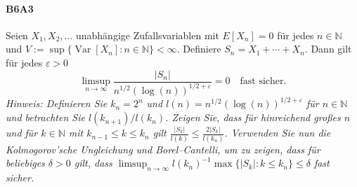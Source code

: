 \documentclass{article}
\begin{document}
\paragraph{B6A3}
Seien $X_1,X_2,\dots$ unabhängige Zufallsvariablen mit $E[X_n]=0$ für jedes $n\in\mathbb{N}$ und $V:=\sup\{\operatorname{Var}[X_n]:n\in\mathbb{N}\}<\infty$.
Definiere $S_n=X_1+\cdots+X_n$.
Dann gilt für jedes $\varepsilon>0$
\[
  \limsup_{n\to\infty}\frac{|S_n|}{n^{1/2}(\log(n))^{1/2+\varepsilon}}=0\quad\text{fast sicher.}
\]
\emph{Hinweis: Definieren Sie $k_n=2^n$ und $l(n)=n^{1/2}(\log(n))^{1/2+\varepsilon}$ für $n\in\mathbb{N}$ und betrachten Sie $l(k_{n+1})/l(k_n)$.
  Zeigen Sie, dass für hinreichend großes $n$ und für $k\in\mathbb{N}$ mit $k_{n-1}\leq k\leq k_n$ gilt $\frac{|S_k|}{l(k)}\leq\frac{2|S_k|}{l({k_n})}$.
  Verwenden Sie nun die Kolmogorov'sche Ungleichung und Borel--Cantelli, um zu zeigen, dass für beliebiges $\delta>0$ gilt, dass $\limsup_{n\to\infty}l(k_n)^{-1}\max\{|S_k|: k\leq k_n\}\leq\delta$ fast sicher.}
\end{document}
